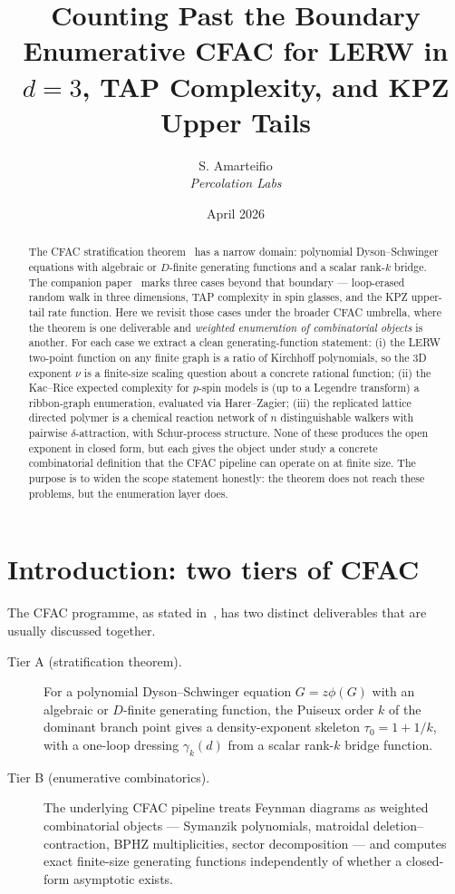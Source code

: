 \documentclass[10pt,a4paper,twocolumn]{article}
\title{Counting Past the Boundary\\[2pt]
  \large Enumerative CFAC for LERW in $d{=}3$, TAP Complexity, and KPZ Upper Tails}
\author{S. Amarteifio\\
  \small\textit{Percolation Labs}}
\date{April 2026}
\theoremstyle{plain}
\theoremstyle{definition}
\begin{document}
\maketitle

\begin{abstract}
The CFAC stratification theorem~\citep{AmarteifioCFAC2026} has a narrow
domain: polynomial Dyson--Schwinger equations with algebraic or
$D$-finite generating functions and a scalar rank-$k$ bridge.  The
companion paper~\citep{AmarteifioMannaC3} marks three cases beyond
that boundary --- loop-erased random walk in three dimensions, TAP
complexity in spin glasses, and the KPZ upper-tail rate function.
Here we revisit those cases under the broader CFAC umbrella, where
the theorem is one deliverable and \emph{weighted enumeration of
combinatorial objects} is another.  For each case we extract a clean
generating-function statement: (i) the LERW two-point function on any
finite graph is a ratio of Kirchhoff polynomials, so the 3D exponent
$\nu$ is a finite-size scaling question about a concrete rational
function; (ii) the Kac--Rice expected complexity for $p$-spin models
is (up to a Legendre transform) a ribbon-graph enumeration, evaluated
via Harer--Zagier; (iii) the replicated lattice directed polymer is a
chemical reaction network of $n$ distinguishable walkers with
pairwise $\delta$-attraction, with Schur-process structure.  None of
these produces the open exponent in closed form, but each gives the
object under study a concrete combinatorial definition that the
CFAC pipeline can operate on at finite size.  The purpose is to
widen the scope statement honestly: the theorem does not reach these
problems, but the enumeration layer does.
\end{abstract}

\tableofcontents

\section{Introduction: two tiers of CFAC}
\label{sec:intro}

The CFAC programme, as stated in~\citep{AmarteifioCFAC2026}, has two
distinct deliverables that are usually discussed together.

\begin{description}
\item[Tier A (stratification theorem).] For a polynomial
  Dyson--Schwinger equation $G = z\phi(G)$ with an algebraic or
  $D$-finite generating function, the Puiseux order $k$ of the
  dominant branch point gives a density-exponent skeleton
  $\tau_0 = 1 + 1/k$, with a one-loop dressing $\gamma_k(d)$ from a
  scalar rank-$k$ bridge function.
\item[Tier B (enumerative combinatorics).] The underlying CFAC
  pipeline treats Feynman diagrams as weighted combinatorial objects
  --- Symanzik polynomials, matroidal deletion--contraction,
  BPHZ multiplicities, sector decomposition --- and computes exact
  finite-size generating functions independently of whether a
  closed-form asymptotic exists.
\end{description}
\end{document}
